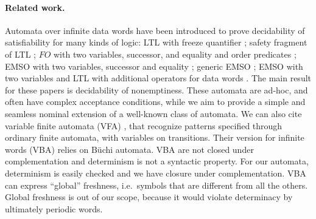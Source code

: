 \paragraph{Related work.}	
Automata over infinite data words have been introduced to prove decidability of satisfiability for many kinds of logic: LTL with freeze quantifier \cite{DemriL09}; safety fragment of LTL \cite{Lazic11}; $FO$ with two variables, successor, and equality and order predicates \cite{BojanczykDMSS11}; EMSO with two variables, successor and equality \cite{KaraST12}; generic EMSO \cite{Bollig11}; EMSO with two variables and LTL with additional operators for data words \cite{KaraT10}. The main result for these papers is decidability of nonemptiness. These automata are ad-hoc, and often have complex acceptance conditions, while we aim to provide a simple and seamless nominal extension of a well-known class of automata. We can also cite variable finite automata (VFA) \cite{GrumbergKS10}, that recognize patterns specified through ordinary finite automata, with variables on transitions. Their version for infinite words (VBA) relies on B\"uchi automata. VBA are not closed under complementation and determinism is not a syntactic property.
For our automata, determinism is easily checked and we have closure under complementation. VBA can express ``global'' freshness, i.e.\ symbols that are different from all the others. Global freshness is out of our scope, because it would violate determinacy by ultimately periodic words.
% 
